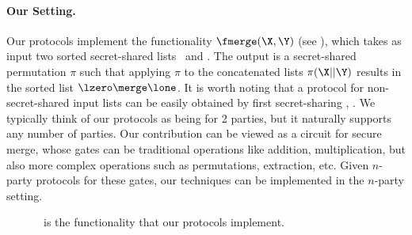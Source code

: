 \paragraph{Our Setting.} Our protocols implement the functionality $\fmerge(\X,\Y)$ (see ), which takes as input two sorted secret-shared lists \lzero\ and \lone.
The output is a secret-shared permutation $\pi$ such that applying $\pi$ to the concatenated lists $\pi(\X||\Y)$ results in the sorted list $\lzero \merge \lone$. It is worth noting that a protocol for non-secret-shared input lists can be easily obtained by first secret-sharing \X, \Y.
We typically think of our protocols as being for 2 parties, but it naturally supports any number of parties. Our contribution can be viewed as a circuit for secure merge, whose gates can be traditional operations like addition, multiplication, but also more complex operations such as permutations, extraction, etc. Given $n$-party protocols for these gates, our techniques can be implemented in the $n$-party setting.

\begin{figure}\hspace{-0cm}\small
	\centering
\vspace{.2cm}	
\caption{%
  \fmerge\ is the functionality that our protocols implement.%
}\label{fig:fmergefunctionality}
	\vspace{-0.4cm}
\end{figure}

\medskip

